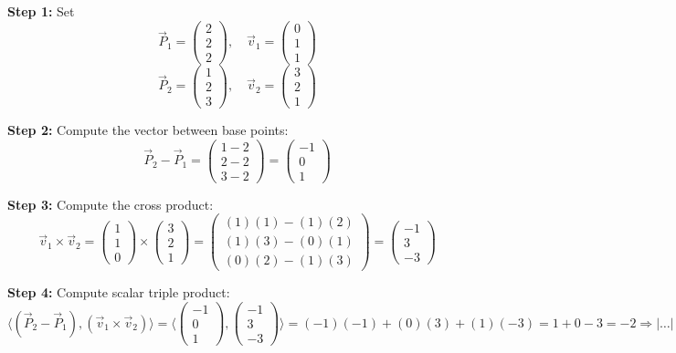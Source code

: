 \textbf{Step 1:} Set
\[
	\vec{P}_1 = \begin{pmatrix} 2 \\ 2 \\ 2 \end{pmatrix}, \quad \vec{v}_1 = \begin{pmatrix} 0 \\ 1 \\ 1 \end{pmatrix}
\]
\[
	\vec{P}_2 = \begin{pmatrix} 1 \\ 2 \\ 3 \end{pmatrix}, \quad \vec{v}_2 = \begin{pmatrix} 3 \\ 2 \\ 1 \end{pmatrix}
\]

\textbf{Step 2:} Compute the vector between base points:
\[
	\vec{P}_2 - \vec{P}_1 = \begin{pmatrix} 1 - 2 \\ 2 - 2 \\ 3 - 2 \end{pmatrix} = \begin{pmatrix} -1 \\ 0 \\ 1 \end{pmatrix}
\]

\textbf{Step 3:} Compute the cross product:
\[
	\vec{v}_1 \times \vec{v}_2 =
	\begin{pmatrix} 1 \\ 1 \\ 0 \end{pmatrix} \times \begin{pmatrix} 3 \\ 2 \\ 1 \end{pmatrix}
	= \begin{pmatrix}
		(1)(1) - (1)(2) \\
		(1)(3) - (0)(1) \\
		(0)(2) - (1)(3)
	\end{pmatrix}
	= \begin{pmatrix}
		-1 \\ 3 \\ -3
	\end{pmatrix}
\]

\textbf{Step 4:} Compute scalar triple product:
\[
	\langle(\vec{P}_2 - \vec{P}_1), (\vec{v}_1 \times \vec{v}_2)\rangle =
	\langle\begin{pmatrix} -1 \\ 0 \\ 1 \end{pmatrix}, \begin{pmatrix} -1 \\ 3 \\ -3 \end{pmatrix}\rangle
	= (-1)(-1) + (0)(3) + (1)(-3) = 1 + 0 - 3 = -2
	\Rightarrow |\dots| = 2
\]

